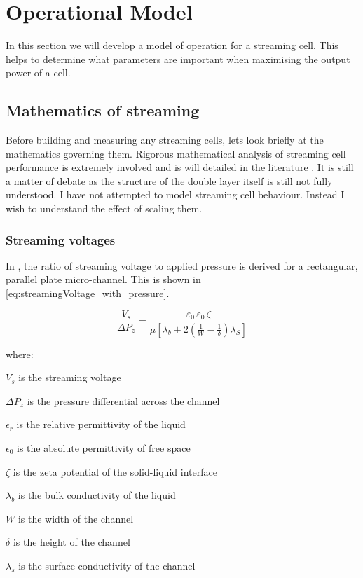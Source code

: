 
\section{Operational Model}

In this section we will develop a model of operation for a streaming cell.
This helps to determine what parameters are important when maximising the output power of a cell.

\subsection{Mathematics of streaming}

Before building and measuring any streaming cells, lets look briefly at the mathematics governing them.
Rigorous mathematical analysis of streaming cell performance is extremely involved and is will detailed in the literature \cite{Yang1998}.
It is still a matter of debate as the structure of the double layer itself is still not fully understood.
I have not attempted to model streaming cell behaviour.
Instead I wish to understand the effect of scaling them.

\subsubsection*{Streaming voltages}

In \cite{Gu2000a}, the ratio of streaming voltage to applied pressure is derived for a rectangular, parallel plate micro-channel.
This is shown in \cref{eq:streamingVoltage_with_pressure}.

\begin{equation}
\frac{V_{s}}{\Delta P_{z}} = \frac{\varepsilon_{0}\,\varepsilon_{0}\,\zeta}{\mu[\lambda_{b}+2(\frac{1}{W}-\frac{1}{\delta})\lambda_{S}]}
\label{eq:streamingVoltage_with_pressure}
\end{equation}

\noindent where:
\begin{description}
    \item $V_{s}$ is the streaming voltage
    \item $\Delta P_{z}$ is the pressure differential across the channel
    \item $\epsilon_{r}$ is the relative permittivity of the liquid
    \item $\epsilon_{0}$ is the absolute permittivity of free space
    \item $\zeta$ is the zeta potential of the solid-liquid interface
    \item $\lambda_{b}$ is the bulk conductivity of the liquid
    \item $W$ is the width of the channel
    \item $\delta$ is the height of the channel
    \item $\lambda_{s}$ is the surface conductivity of the channel
\end{description}


